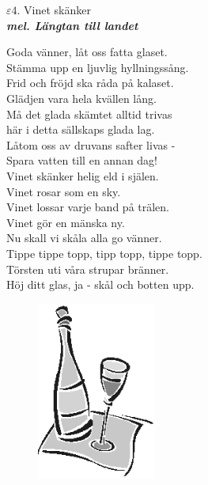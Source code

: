\documentclass[a6paper,10pt]{article}
\newcommand{\mel}[1]{\small\textbf{\textit{mel. #1 \\}}}
\begin{document}
\setlength{\oddsidemargin}{-0.47in}
\noindent
\begin{center}
\Large $\varepsilon4$. Vinet skänker \\ 
\mel{Längtan till landet}
\end{center}
Goda vänner, låt oss fatta glaset.\\
Stämma upp en ljuvlig hyllningssång.\\
Frid och fröjd ska råda på kalaset.\\
Glädjen vara hela kvällen lång.
\vspace{5pt}\\
Må det glada skämtet alltid trivas\\
här i detta sällskaps glada lag.\\
Låtom oss av druvans safter livas -\\
Spara vatten till en annan dag!
\vspace{5pt}\\
Vinet skänker helig eld i själen.\\
Vinet rosar som en sky.\\
Vinet lossar varje band på trälen.\\
Vinet gör en mänska ny.
\vspace{5pt}\\
Nu skall vi skåla alla go vänner.\\
Tippe tippe topp, tipp topp, tippe topp.\\
Törsten uti våra strupar bränner.\\
Höj ditt glas, ja - skål och botten upp. 
\begin{figure}[!h]
\hfill
\includegraphics[width=0.35\textwidth]{wine.png}
\end{figure}
\end{document}
